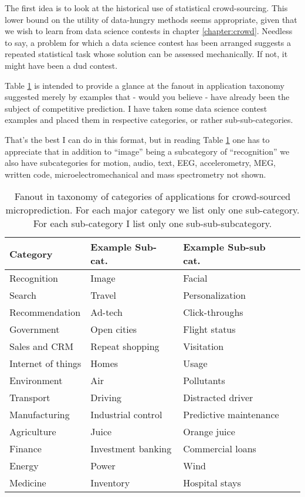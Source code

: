The first idea is to look at the historical use of statistical crowd-sourcing. This lower bound on the utility of data-hungry methods seems appropriate, given that we wish to learn from data science contests in chapter \ref{chapter:crowd}. Needless to say, a problem for which a data science contest has been arranged suggests a repeated statistical task whose solution can be assessed mechanically. If not, it might have been a dud contest.  


Table \ref{tab:categories} is intended to provide a glance at the fanout in application taxonomy suggested merely by examples that - would you believe - have already been the subject of competitive prediction. I have taken some data science contest examples and placed them in respective categories, or rather sub-sub-categories. 

That's the best I can do in this format, but in reading Table \ref{tab:categories} one has to appreciate that in addition to ``image'' being a subcategory of ``recognition'' we also have subcategories for motion, audio, text, EEG, accelerometry, MEG, written code, microelectromechanical and mass spectrometry not shown. 

\begin{table}[h!]
\begin{tabular}{|l|l|l|l|}
\hline
 Category & Example Sub-cat. & Example Sub-sub cat. \\
 \hline
  Recognition &  Image & Facial  \\
  Search      &  Travel & Personalization \\
  Recommendation &  Ad-tech & Click-throughs \\
  Government &  Open cities & Flight status \\
  Sales and CRM   &  Repeat shopping & Visitation  \\
  Internet of things &  Homes & Usage  \\
  Environment        &  Air  & Pollutants  \\
  Transport          &  Driving & Distracted driver  \\
  Manufacturing  &  Industrial control & Predictive maintenance  \\
  Agriculture        &  Juice & Orange juice  \\
  Finance        &  Investment banking & Commercial loans \\
  Energy        & Power & Wind  \\
  Medicine        &  Inventory & Hospital stays \\
  \hline
\end{tabular}
\caption{Fanout in taxonomy of categories of applications for crowd-sourced microprediction. For each major category we list only one sub-category. For each sub-category I list only one sub-sub-subcategory.}
\label{tab:categories}
\end{table}
  
